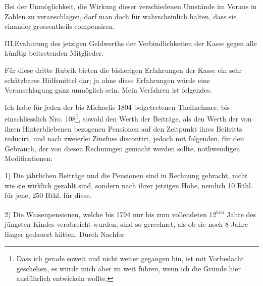 Bei der Unmöglichkeit, die Wirkung dieser verschiedenen Umstände im Voraus in Zahlen zu veranschlagen, darf man doch für wahrscheinlich halten, dass sie einander grossentheils compensiren.

\par\medskip\noindent III.\quad Evaluirung des jetzigen Geldwerths der Verbindlichkeiten der Kasse gegen alle künftig beitretenden Mitglieder.\par\smallskip
Für diese dritte Rubrik bieten die bisherigen Erfahrungen der Kasse ein sehr schätzbares Hülfsmittel dar; ja ohne diese Erfahrungen würde eine Veranschlagung ganz unmöglich sein. Mein Verfahren ist folgendes.

Ich habe für jeden der bis Michaelis 1804 beigetretenen Theilnehmer, bis einschliesslich Nro. 108\footnote{Dass ich gerade soweit und nicht weiter gegangen bin, ist mit Vorbedacht geschehen, es würde mich aber zu weit führen, wenn ich die Gründe hier ausführlich entwickeln wollte.}, sowohl den Werth der Beiträge, als den Werth der von ihren Hinterbliebenen bezogenen Pensionen auf den Zeitpunkt ihres Beitritts reducirt, und nach zweierlei Zinsfuss discontirt, jedoch mit folgenden, für den Gebrauch, der von diesen Rechnungen gemacht werden sollte, nothwendigen Modificationen:

1) Die jährlichen Beiträge und die Pensionen sind in Rechnung gebracht, nicht wie sie wirklich gezahlt sind, sondern nach ihrer jetzigen Höhe, nemlich 10 Rthl. für jene, 250 Rthl. für diese.

2) Die Waisenpensionen, welche bis 1794 nur bis zum vollendeten 12\textsuperscript{ten} Jahre des jüngsten Kindes verabreicht wurden, sind so gerechnet, als ob sie noch 8 Jahre länger gedauert hätten. Durch Nachfor%
